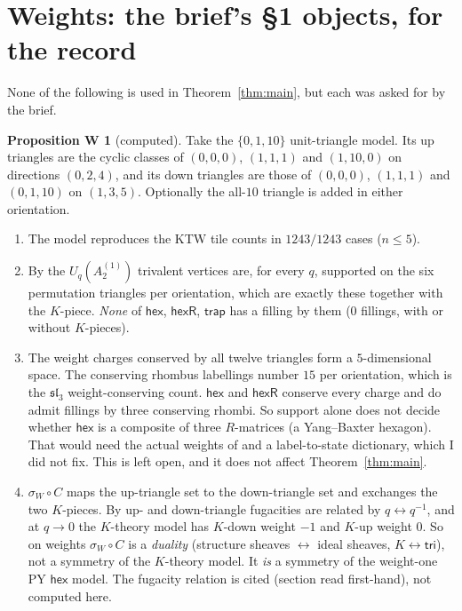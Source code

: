 \documentclass[11pt]{article}
\theoremstyle{definition}
\newtheorem*{propW}{Proposition W}
\newcommand{\hex}{\mathsf{hex}}
\newcommand{\hexR}{\mathsf{hexR}}
\newcommand{\trap}{\mathsf{trap}}
\begin{document}
\section{Weights: the brief's \S1 objects, for the record}

None of the following is used in Theorem~\ref{thm:main}, but each was asked for by the brief.

\begin{propW}[computed]\label{prop:support}
Take the $\{0,1,10\}$ unit-triangle model. Its up triangles are the cyclic classes of $(0,0,0)$,
$(1,1,1)$ and $(1,10,0)$ on directions $(0,2,4)$, and its down triangles are those of $(0,0,0)$,
$(1,1,1)$ and $(0,1,10)$ on $(1,3,5)$. Optionally the all-$10$ triangle is added in either
orientation.
\begin{enumerate}
\item The model reproduces the KTW tile counts in $1243/1243$ cases ($n\le5$).
\item By \cite[\S3.5]{KZJ} the $U_q(A_2^{(1)})$ trivalent vertices are, for every $q$, supported on the
six permutation triangles per orientation, which are exactly these together with the $K$-piece.
\emph{None} of $\hex$, $\hexR$, $\trap$ has a filling by them ($0$ fillings, with or without
$K$-pieces).
\item The weight charges conserved by all twelve triangles form a $5$-dimensional space. The
conserving rhombus labellings number $15$ per orientation, which is the $\mathfrak{sl}_3$
weight-conserving count. $\hex$ and $\hexR$ conserve every charge and do admit fillings by three
conserving rhombi. So support alone does not decide whether $\hex$ is a composite of three
$R$-matrices (a Yang--Baxter hexagon). That would need the actual weights of \cite{WZJ} and a
label-to-state dictionary, which I did not fix. This is left open, and it does not affect
Theorem~\ref{thm:main}.
\item $\sigma_W\circ C$ maps the up-triangle set to the down-triangle set and exchanges the two
$K$-pieces. By \cite[\S3.5]{KZJ} up- and down-triangle fugacities are related by $q\leftrightarrow
q^{-1}$, and at $q\to0$ the $K$-theory model has $K$-down weight $-1$ and $K$-up weight $0$. So on
weights $\sigma_W\circ C$ is a \emph{duality} (structure sheaves $\leftrightarrow$ ideal sheaves,
$K\leftrightarrow\mathsf{tri}$), not a symmetry of the $K$-theory model. It \emph{is} a symmetry of
the weight-one PY $\hex$ model. The fugacity relation is cited (section read first-hand), not computed here.
\end{enumerate}
\end{propW}
\end{document}
